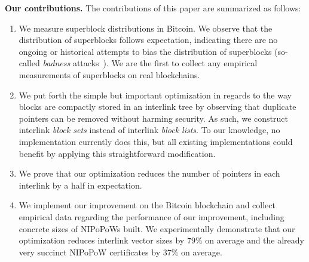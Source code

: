 \noindent
\textbf{Our contributions.} The contributions of this paper are summarized as
follows:

\begin{enumerate}
  \item We measure superblock distributions in Bitcoin. We observe that the
        distribution of superblocks follows expectation, indicating there are no
        ongoing or historical attempts to bias the distribution of superblocks
        (so-called \emph{badness} attacks~\cite{nipopows}). We are the first to
        collect any empirical measurements of superblocks on real blockchains.
  \item We put forth the simple but important optimization in regards to the way
        blocks are compactly stored in an interlink tree by observing that
        duplicate pointers can be removed without harming security. As such, we
        construct interlink \emph{block sets} instead of interlink \emph{block
        lists}. To our knowledge, no implementation currently does this, but all
        existing implementations could benefit by applying this straightforward
        modification.
  \item We prove that our optimization reduces the number of pointers in each
        interlink by a half in expectation.
  \item We implement our improvement on the Bitcoin blockchain and collect
        empirical data regarding the performance of our improvement, including
        concrete sizes of NIPoPoWs built. We experimentally demonstrate that our
        optimization reduces interlink vector sizes by $79\%$ on average and
        the already very succinct NIPoPoW certificates by $37\%$ on average.
\end{enumerate}
